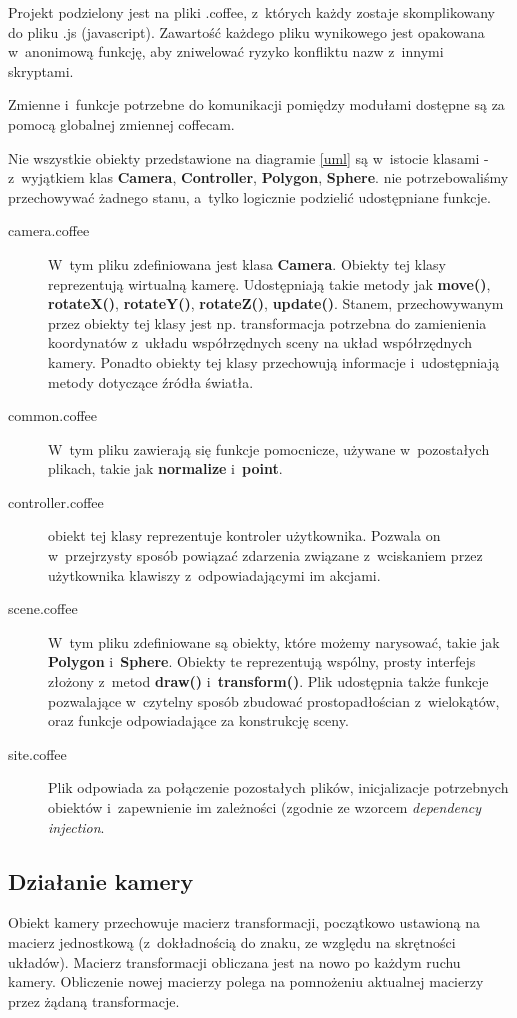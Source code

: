 \documentclass[a4paper]{article}
\begin{document}
{Projekt podzielony jest na pliki .coffee, z~których każdy zostaje skomplikowany do pliku .js (javascript).
Zawartość każdego pliku wynikowego jest opakowana w~anonimową funkcję, aby zniwelować ryzyko konfliktu nazw z~innymi skryptami.

Zmienne i~funkcje potrzebne do komunikacji pomiędzy modułami dostępne są za pomocą globalnej zmiennej coffecam.

Nie wszystkie obiekty przedstawione na diagramie \ref{uml} są w~istocie klasami - z~wyjątkiem klas 
\textbf{Camera}, \textbf{Controller}, \textbf{Polygon}, \textbf{Sphere}.
nie potrzebowaliśmy przechowywać żadnego stanu, a~tylko logicznie podzielić udostępniane funkcje.
\begin{description}
  \item[camera.coffee] W~tym pliku zdefiniowana jest klasa \textbf{Camera}. Obiekty tej klasy reprezentują wirtualną kamerę.
    Udostępniają takie metody jak \textbf{move()}, \textbf{rotateX()}, \textbf{rotateY()}, \textbf{rotateZ()}, \textbf{update()}.
    Stanem, przechowywanym przez obiekty tej klasy jest np. transformacja potrzebna do zamienienia koordynatów z~układu współrzędnych sceny na układ współrzędnych kamery. Ponadto obiekty tej klasy przechowują informacje i~udostępniają metody dotyczące źródła światła.
  \item[common.coffee] W~tym pliku zawierają się funkcje pomocnicze, używane w~pozostałych plikach, takie jak \textbf{normalize} i~\textbf{point}.
  \item[controller.coffee] obiekt tej klasy reprezentuje kontroler użytkownika.
    Pozwala on w~przejrzysty sposób powiązać zdarzenia związane z~wciskaniem przez użytkownika klawiszy z~odpowiadającymi im akcjami.
  \item[scene.coffee] W~tym pliku zdefiniowane są obiekty, które możemy narysować, takie jak \textbf{Polygon} i~\textbf{Sphere}.
    Obiekty te reprezentują wspólny, prosty interfejs złożony z~metod \textbf{draw()} i~\textbf{transform()}.
    Plik udostępnia także funkcje pozwalające w~czytelny sposób zbudować prostopadłościan z~wielokątów, oraz funkcje odpowiadające za konstrukcję sceny.
  \item[site.coffee] Plik odpowiada za połączenie pozostałych plików, inicjalizacje potrzebnych obiektów i~zapewnienie im zależności (zgodnie ze wzorcem \emph{dependency injection}.
\end{description}

\subsection{Działanie kamery}
Obiekt kamery przechowuje macierz transformacji, początkowo ustawioną na macierz jednostkową (z~dokładnością do znaku, ze względu na skrętności układów)\cite{openGL}.
Macierz transformacji obliczana jest na nowo po każdym ruchu kamery. Obliczenie nowej macierzy polega na pomnożeniu aktualnej macierzy przez żądaną transformacje.

}
\end{document}
